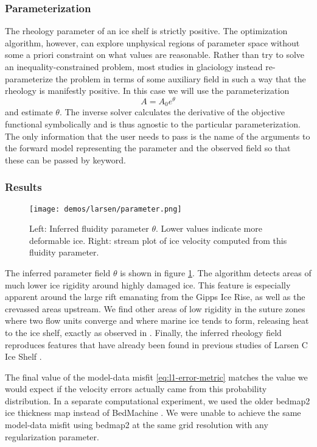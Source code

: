 \documentclass{article}
\theoremstyle{definition}
\theoremstyle{plain}
\begin{document}
\subsubsection{Parameterization}

The rheology parameter of an ice shelf is strictly positive.
The optimization algorithm, however, can explore unphysical regions of parameter space without some a priori constraint on what values are reasonable.
Rather than try to solve an inequality-constrained problem, most studies in glaciology instead re-parameterize the problem in terms of some auxiliary field in such a way that the rheology is manifestly positive.
In this case we will use the parameterization
\begin{equation}
    A = A_0e^{\theta}
\end{equation}
and estimate $\theta$.
The inverse solver calculates the derivative of the objective functional symbolically and is thus agnostic to the particular parameterization.
The only information that the user needs to pass is the name of the arguments to the forward model representing the parameter and the observed field so that these can be passed by keyword.


\subsubsection{Results}

\begin{figure}[h]
    \texttt{[image: demos/larsen/parameter.png]}
    \caption{Left: Inferred fluidity parameter $\theta$.
    Lower values indicate more deformable ice.
    Right: stream plot of ice velocity computed from this fluidity parameter.}
    \label{fig:larsen}
\end{figure}

The inferred parameter field $\theta$ is shown in figure \ref{fig:larsen}.
The algorithm detects areas of much lower ice rigidity around highly damaged ice.
This feature is especially apparent around the large rift emanating from the Gipps Ice Rise, as well as the crevassed areas upstream.
We find other areas of low rigidity in the suture zones where two flow units converge and where marine ice tends to form, releasing heat to the ice shelf, exactly as observed in \citet{holland2009marine}.
Finally, the inferred rheology field reproduces features that have already been found in previous studies of Larsen C Ice Shelf \citep{khazendar2011acceleration}.

The final value of the model-data misfit \eqref{eq:l1-error-metric} matches the value we would expect if the velocity errors actually came from this probability distribution.
In a separate computational experiment, we used the older bedmap2 ice thickness map instead of BedMachine \citep{fretwell2013bedmap2}.
We were unable to achieve the same model-data misfit using bedmap2 at the same grid resolution with any regularization parameter.
\end{document}
